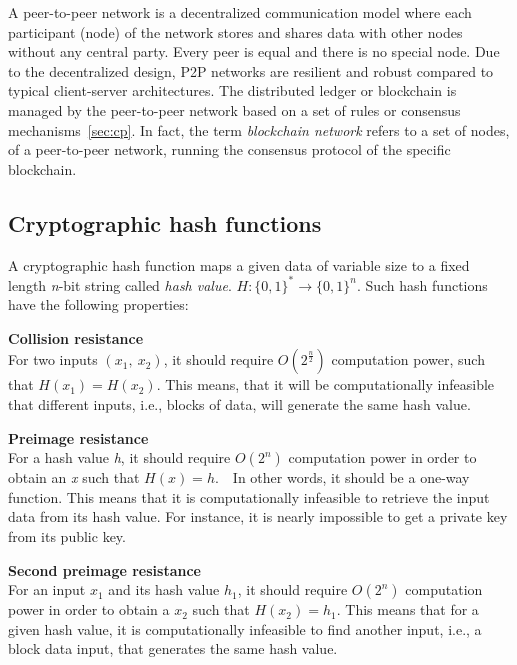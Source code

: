 \documentclass[11pt,a4paper]{report}
\begin{document}
A peer-to-peer network\cite{book:masteringBTCp2p}\cite{wiki:Peer-to-peer} is a decentralized communication model where each participant (node) of the network stores and shares data with other nodes without any central party. Every peer is equal and there is no special node. Due to the decentralized design, P2P networks are resilient and robust compared to typical client-server architectures. The distributed ledger or blockchain is managed by the peer-to-peer network based on a set of rules or consensus mechanisms~\ref{sec:cp}. In fact, the term \emph{blockchain network} refers to a set of nodes, of a peer-to-peer network, running the consensus protocol of the specific blockchain.


\subsection{Cryptographic hash functions}\label{sec:chf}
A cryptographic hash function\cite{chf}\cite{book:chf} maps a given data of variable size to a fixed length \emph{n}-bit string called \textit{hash value}. $ H : \{0,1\}^* \to \{0,1\}^n $. Such hash functions have the following properties:
\begin{description}		
	\item \textbf{Collision resistance}\\ For two inputs $(x_1,~x_2)$, it should require $ O(2^\frac{n}{2})$ computation power, such that $H(x_1) = H(x_2)$. This means, that it will be computationally infeasible that different inputs, i.e., blocks of data, will generate the same hash value.
	\item \textbf{Preimage resistance}\\ For a hash value \emph{h}, it should require $ O(2^n) $ computation power in order to obtain an \emph{x} such that $ H(x)=h $.~~In other words, it should be a one-way function. 
	This means that it is computationally infeasible to retrieve the input data from its hash value. For instance, it is nearly impossible to get a private key from its public key.	
	\item \textbf{Second preimage resistance}\\ For an input $x_1$ and its hash value $h_1$, it should require $ O(2^n) $ computation power in order to obtain a $x_2$ such that $H(x_2)=h_1.$ This means that for a given hash value, it is computationally infeasible to find another input, i.e., a block data input, that generates the same hash value. 	
\end{description}
\end{document}
